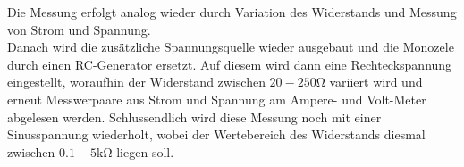 \noindent Die Messung erfolgt analog wieder durch Variation des Widerstands und Messung von Strom
und Spannung. \\
\noindent Danach wird die zusätzliche Spannungsquelle wieder ausgebaut und die
Monozele durch einen RC-Generator ersetzt. Auf diesem wird dann eine
Rechteckspannung eingestellt, woraufhin der Widerstand zwischen $ 20-250 \si{\ohm}$
variiert wird und erneut Messwerpaare aus Strom und Spannung am Ampere- und Volt-Meter
abgelesen werden.
Schlussendlich wird diese Messung noch mit einer Sinusspannung wiederholt, wobei
der Wertebereich des Widerstands diesmal zwischen $0.1 - 5 \si{\kilo\ohm}$ liegen
soll.
